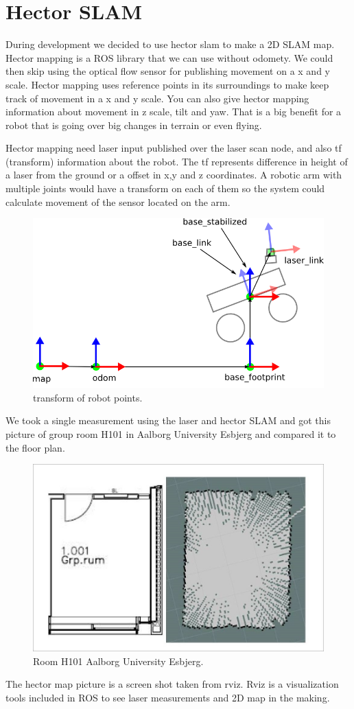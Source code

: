 \clearpage
\section{Hector SLAM}
During development we decided to use hector slam to make a 2D SLAM map. Hector mapping is a ROS library that we can use without odomety. %
We could then skip using the optical flow sensor for publishing movement on a x and y scale. Hector mapping uses reference points in its surroundings to make keep track of movement in a x and y scale. You can also give hector mapping information about movement in z scale, tilt and yaw. That is a big benefit for a robot that is going over big changes in terrain or even flying. 

Hector mapping need laser input published over the laser scan node, and also tf (transform) information about the robot. The tf represents difference in height of a laser from the ground or a offset in x,y and z coordinates. A robotic arm with multiple joints would have a transform on each of them so the system could calculate movement of the sensor located on the arm.

\begin{figure}[H]
	\centering
	\includegraphics[width=.3\linewidth]{images/tf.png}
	\caption{transform of robot points.} %
\end{figure}

We took a single measurement using the laser and hector SLAM and got this picture of group room H101 in Aalborg University Esbjerg and compared it to the floor plan. 

\begin{figure}[H]
	\centering
	\includegraphics[width=.3\linewidth]{images/compare.jpg}
	\caption{Room H101 Aalborg University Esbjerg.}
\end{figure}

The hector map picture is a screen shot taken from rviz. Rviz is a visualization tools included in ROS to see laser measurements and 2D map in the making. %

